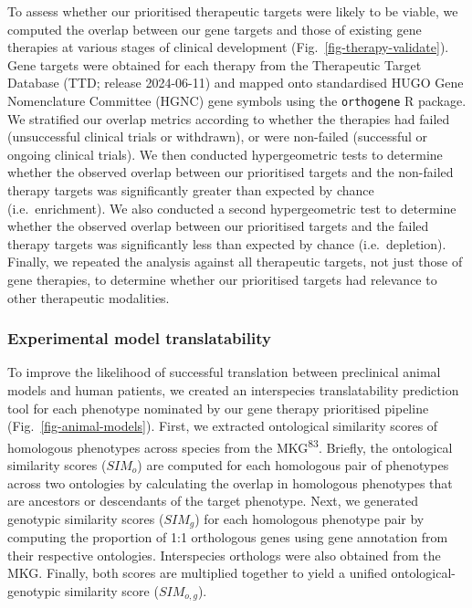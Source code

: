 \documentclass[
]{agujournal2019}
\begin{document}
To assess whether our prioritised therapeutic targets were likely to be
viable, we computed the overlap between our gene targets and those of
existing gene therapies at various stages of clinical development
(Fig.~\ref{fig-therapy-validate}). Gene targets were obtained for each
therapy from the Therapeutic Target Database (TTD; release 2024-06-11)
and mapped onto standardised HUGO Gene Nomenclature Committee (HGNC)
gene symbols using the \texttt{orthogene} R package. We stratified our
overlap metrics according to whether the therapies had failed
(unsuccessful clinical trials or withdrawn), or were non-failed
(successful or ongoing clinical trials). We then conducted
hypergeometric tests to determine whether the observed overlap between
our prioritised targets and the non-failed therapy targets was
significantly greater than expected by chance (i.e.~enrichment). We also
conducted a second hypergeometric test to determine whether the observed
overlap between our prioritised targets and the failed therapy targets
was significantly less than expected by chance (i.e.~depletion).
Finally, we repeated the analysis against all therapeutic targets, not
just those of gene therapies, to determine whether our prioritised
targets had relevance to other therapeutic modalities.

\subsubsection{Experimental model
translatability}\label{experimental-model-translatability-1}

To improve the likelihood of successful translation between preclinical
animal models and human patients, we created an interspecies
translatability prediction tool for each phenotype nominated by our gene
therapy prioritised pipeline (Fig.~\ref{fig-animal-models}). First, we
extracted ontological similarity scores of homologous phenotypes across
species from the MKG\textsuperscript{83}. Briefly, the ontological
similarity scores (\(SIM_o\)) are computed for each homologous pair of
phenotypes across two ontologies by calculating the overlap in
homologous phenotypes that are ancestors or descendants of the target
phenotype. Next, we generated genotypic similarity scores (\(SIM_g\))
for each homologous phenotype pair by computing the proportion of 1:1
orthologous genes using gene annotation from their respective
ontologies. Interspecies orthologs were also obtained from the MKG.
Finally, both scores are multiplied together to yield a unified
ontological-genotypic similarity score (\(SIM_{o,g}\)).
\end{document}
